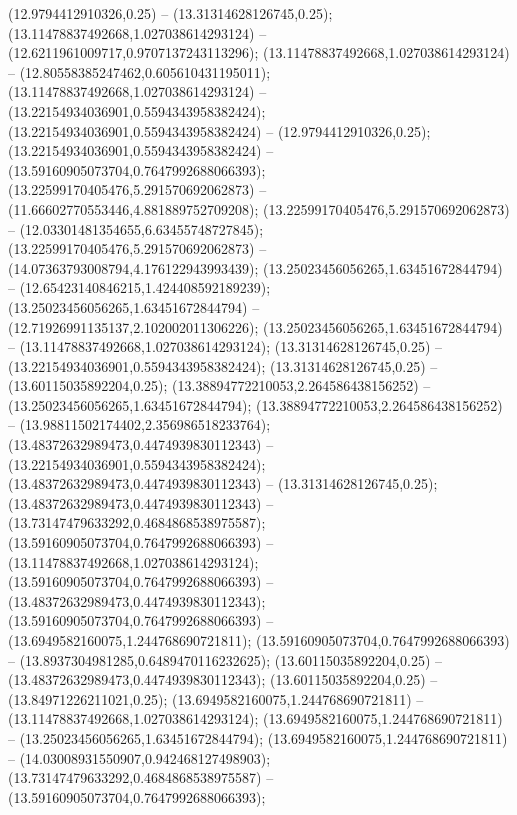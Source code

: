  (12.9794412910326,0.25) -- (13.31314628126745,0.25);
 (13.11478837492668,1.027038614293124) -- (12.6211961009717,0.9707137243113296);
 (13.11478837492668,1.027038614293124) -- (12.80558385247462,0.605610431195011);
 (13.11478837492668,1.027038614293124) -- (13.22154934036901,0.5594343958382424);
 (13.22154934036901,0.5594343958382424) -- (12.9794412910326,0.25);
 (13.22154934036901,0.5594343958382424) -- (13.59160905073704,0.7647992688066393);
 (13.22599170405476,5.291570692062873) -- (11.66602770553446,4.881889752709208);
 (13.22599170405476,5.291570692062873) -- (12.03301481354655,6.63455748727845);
 (13.22599170405476,5.291570692062873) -- (14.07363793008794,4.176122943993439);
 (13.25023456056265,1.63451672844794) -- (12.65423140846215,1.424408592189239);
 (13.25023456056265,1.63451672844794) -- (12.71926991135137,2.102002011306226);
 (13.25023456056265,1.63451672844794) -- (13.11478837492668,1.027038614293124);
 (13.31314628126745,0.25) -- (13.22154934036901,0.5594343958382424);
 (13.31314628126745,0.25) -- (13.60115035892204,0.25);
 (13.38894772210053,2.264586438156252) -- (13.25023456056265,1.63451672844794);
 (13.38894772210053,2.264586438156252) -- (13.98811502174402,2.356986518233764);
 (13.48372632989473,0.4474939830112343) -- (13.22154934036901,0.5594343958382424);
 (13.48372632989473,0.4474939830112343) -- (13.31314628126745,0.25);
 (13.48372632989473,0.4474939830112343) -- (13.73147479633292,0.4684868538975587);
 (13.59160905073704,0.7647992688066393) -- (13.11478837492668,1.027038614293124);
 (13.59160905073704,0.7647992688066393) -- (13.48372632989473,0.4474939830112343);
 (13.59160905073704,0.7647992688066393) -- (13.6949582160075,1.244768690721811);
 (13.59160905073704,0.7647992688066393) -- (13.8937304981285,0.6489470116232625);
 (13.60115035892204,0.25) -- (13.48372632989473,0.4474939830112343);
 (13.60115035892204,0.25) -- (13.84971226211021,0.25);
 (13.6949582160075,1.244768690721811) -- (13.11478837492668,1.027038614293124);
 (13.6949582160075,1.244768690721811) -- (13.25023456056265,1.63451672844794);
 (13.6949582160075,1.244768690721811) -- (14.03008931550907,0.942468127498903);
 (13.73147479633292,0.4684868538975587) -- (13.59160905073704,0.7647992688066393);
